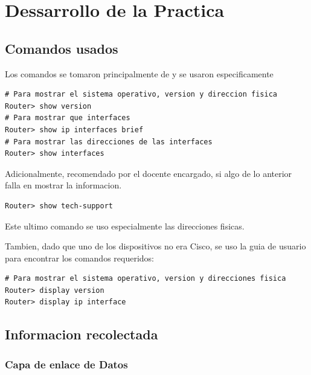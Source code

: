 
\newpage
\section{Dessarrollo de la Practica}

\subsection{Comandos usados}
Los comandos se tomaron principalmente de \cite{comandos_cisco} y se usaron especificamente
\begin{verbatim}
# Para mostrar el sistema operativo, version y direccion fisica
Router> show version 
# Para mostrar que interfaces
Router> show ip interfaces brief 
# Para mostrar las direcciones de las interfaces
Router> show interfaces 
\end{verbatim}
Adicionalmente, recomendado por el docente encargado, si algo de lo anterior falla en mostrar la 
informacion.
\begin{verbatim}
Router> show tech-support 
\end{verbatim}
Este ultimo comando se uso especialmente las direcciones fisicas.

Tambien, dado que uno de los dispositivos no era Cisco, se uso la guia de usuario
\cite{3com4500_config_manual} para encontrar los comandos requeridos:
\begin{verbatim}
# Para mostrar el sistema operativo, version y direcciones fisica
Router> display version
Router> display ip interface
\end{verbatim}

\subsection{Informacion recolectada}

\subsubsection*{Capa de enlace de Datos}

